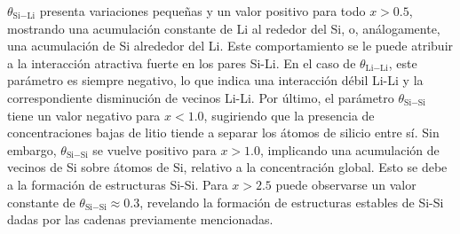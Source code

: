 $\theta_{\text{Si}-\text{Li}}$ presenta variaciones pequeñas y un valor positivo para todo 
$x > 0.5$, mostrando una acumulación constante de Li al rededor del Si, o, 
análogamente, una acumulación de Si alrededor del Li. Este comportamiento se le 
puede atribuir a la interacción atractiva fuerte en los pares Si-Li. En el caso de 
$\theta_{\text{Li}-\text{Li}}$, este parámetro es siempre negativo, lo que indica una 
interacción débil Li-Li y la correspondiente disminución de vecinos Li-Li. Por
último, el parámetro $\theta_{\text{Si}-\text{Si}}$ tiene un valor negativo para $x < 1.0$, 
sugiriendo que la presencia de concentraciones bajas de litio tiende a separar 
los átomos de silicio entre sí. Sin embargo, $\theta_{\text{Si}-\text{Si}}$ se vuelve positivo
para $x > 1.0$, implicando una acumulación de vecinos de Si sobre átomos de Si, 
relativo a la concentración global. Esto se debe a la formación de estructuras 
Si-Si. Para $x > 2.5$ puede observarse un valor constante de 
$\theta_{\text{Si}-\text{Si}} \approx 0.3$, revelando la formación de estructuras estables de 
Si-Si dadas por las cadenas previamente mencionadas.
